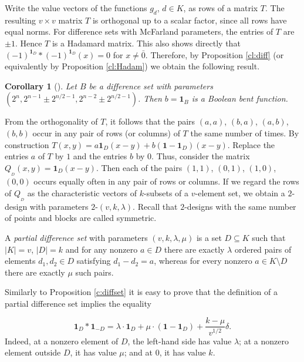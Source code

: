 \documentclass[11pt]{article}
\newtheorem{corollary}{Corollary}[section]
\theoremstyle{definition}
\begin{document}
{{{Write the value vectors of the functions $g_d$, $d\in K$, as rows of a matrix
$T$. The resulting $v\times v$ matrix $T$ is orthogonal up to a scalar factor, since all rows have equal norms. 
For difference sets with McFarland parameters, the entries of $T$ are $\pm1$. Hence $T$ is a Hadamard matrix. This also shows directly that
 $(-1)^{{\mathbf 1}_{D}}*(-1)^{{\mathbf 1}_{D}}(x)=0$ for $x\neq
\bar 0$. Therefore, by Proposition \ref{cl:diff} (or equivalently by
Proposition \ref{cl:Hadam}) we obtain the following result.

\begin{corollary}[\cite{Mesnager}]\label{cor:bent_diffset1} Let $B$ be a difference set with parameters
$(2^n,2^{n-1}\pm2^{n/2-1},2^{n-2}\pm2^{n/2-1})$. Then $b={\mathbf 1}_{B}$
is a Boolean bent function.
\end{corollary}

From the orthogonality of $T$, it follows that the pairs $(a,a)$,  $(b,a)$, $(a,b)$, $(b,b)$ occur in any pair of rows
(or columns) of $T$ the same number of times.
 By
construction $T(x,y)=a{\mathbf 1}_{D}(x-y)+b(\mathbf{1} -{\mathbf 1}_{D})(x-y)$.
Replace  the entries $a$ of $T$ by $1$ and the entries $b$ by $0$. Thus, 
consider the matrix $Q_{_D}(x,y)={\mathbf 1}_{D}(x-y)$. Then each of
the pairs $(1, 1)$, $(0, 1)$, $(1, 0)$, $(0, 0)$ occurs equally often  in any pair of rows or
columns.
   If we regard the rows of $Q_{_D}$ as the characteristic
   vectors of $k$-subsets of a $v$-element set, we obtain
   a $2$-design with parameters $2$-$(v,k,\lambda)$.
 Recall that 
 $2$-designs with the same number of points and blocks  are called symmetric.



  A {\sl partial difference set}
     with parameters $(v,k,\lambda,\mu)$ is a set $D\subseteq K$
    such that $|K|=v$, $|D|=k$ and for any nonzero $a\in D$
    there are exactly $\lambda$ ordered pairs of elements $d_1, d_2\in D$ satisfying
    $d_1-d_2=a$, whereas for every nonzero $a\in K\setminus D$
    there are exactly $\mu$ such pairs.

Similarly to Proposition \ref{c:diffset} it is easy to prove that the
definition of a partial difference set implies  the equality

\begin{equation}\label{eq:partdiff} {\mathbf 1}_{D}
*{\mathbf 1}_{-D}=\lambda\cdot{\mathbf 1}_{D}+\mu\cdot(\mathbf{1}-{\mathbf 1}_{D})+
\frac{k-\mu}{v^{1/2}}\delta.\end{equation}
Indeed, at a nonzero element of $D$, the left-hand side has value $\lambda$; at a nonzero element outside $D$, it has value $\mu$; and at $0$, it has value $k$.

}}}
\end{document}
